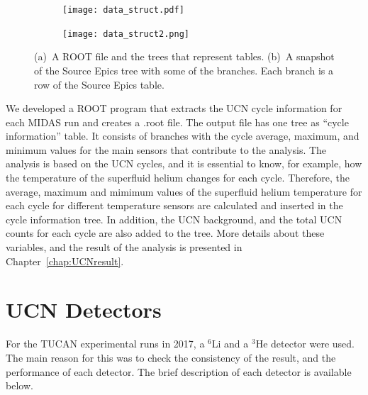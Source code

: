 \begin{figure}
\begin{subfigure}{.45\textwidth}
  \centering
  \texttt{[image: data\_struct.pdf]}
  \caption{}
  \label{fig:sfig1}
\end{subfigure}%
\begin{subfigure}{.45\textwidth}
  \centering
  \texttt{[image: data\_struct2.png]}
  \caption{}
  \label{fig:sfig2}
\end{subfigure}
\caption{(a)~A ROOT file and the trees that represent tables. (b)~A
  snapshot of the Source Epics tree with some of the branches. Each
  branch is a row of the Source Epics table. }
\label{fig:data_struct}
\end{figure}

We developed a ROOT program that extracts the UCN cycle information
for each MIDAS run and creates a .root file.  The output file has one
tree as ``cycle information'' table. It consists of branches with the
cycle average, maximum, and minimum values for the main sensors that
contribute to the analysis.  The analysis is based on the UCN cycles,
and it is essential to know, for example, how the temperature of the
superfluid helium changes for each cycle. Therefore, the average,
maximum and mimimum values of the superfluid helium temperature for
each cycle for different temperature sensors are calculated and
inserted in the cycle information tree. In addition, the UCN
background, and the total UCN counts for each cycle are also added to
the tree. More details about these variables, and the result of the
analysis is presented in Chapter~\ref{chap:UCNresult}.






\section{UCN Detectors\label{sec:detectors}}
For the TUCAN experimental runs in 2017, a $^6$Li and a $^3$He
detector were used. The main reason for this was to check the
consistency of the result, and the performance of each detector. The
brief description of each detector is available below.

